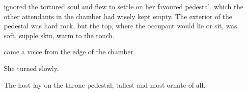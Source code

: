 \Nzessua{} ignored the tortured soul and flew to settle on her favoured pedestal, which the other attendants in the chamber had wisely kept empty. The exterior of the pedestal was hard rock, but the top, where the occupant would lie or sit, was soft, supple skin, warm to the touch. 

\ta{\Nzessuacrith,} came a voice from the edge of the chamber. 

She turned slowly.  

The host lay on the throne pedestal, tallest and most ornate of all. 






